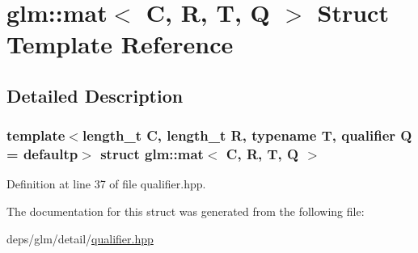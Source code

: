 \hypertarget{structglm_1_1mat}{}\section{glm\+:\+:mat$<$ C, R, T, Q $>$ Struct Template Reference}
\label{structglm_1_1mat}


\subsection{Detailed Description}
\subsubsection*{template$<$length\+\_\+t C, length\+\_\+t R, typename T, qualifier Q = defaultp$>$\newline
struct glm\+::mat$<$ C, R, T, Q $>$}



Definition at line 37 of file qualifier.\+hpp.



The documentation for this struct was generated from the following file\+:\begin{DoxyCompactItemize}
\item 
deps/glm/detail/\hyperlink{qualifier_8hpp}{qualifier.\+hpp}\end{DoxyCompactItemize}
